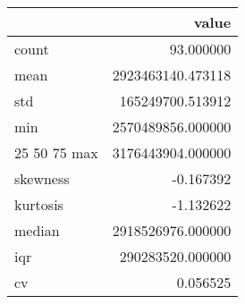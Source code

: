 \begin{tabular}{lr}
\toprule
 & value \\
\midrule
count & 93.000000 \\
mean & 2923463140.473118 \\
std & 165249700.513912 \\
min & 2570489856.000000 \\
25%
50%
75%
max & 3176443904.000000 \\
skewness & -0.167392 \\
kurtosis & -1.132622 \\
median & 2918526976.000000 \\
iqr & 290283520.000000 \\
cv & 0.056525 \\
\bottomrule
\end{tabular}
